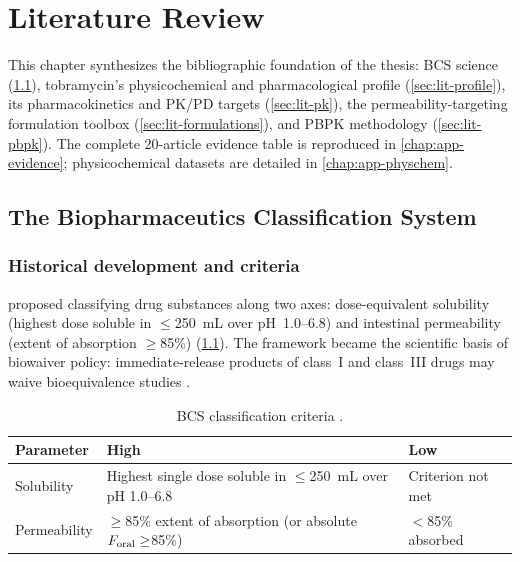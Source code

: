 \chapter{Literature Review}
\label{chap:literature}

This chapter synthesizes the bibliographic foundation of the thesis: BCS science (\cref{sec:lit-bcs}), tobramycin's physicochemical and pharmacological profile (\cref{sec:lit-profile}), its pharmacokinetics and PK/PD targets (\cref{sec:lit-pk}), the permeability-targeting formulation toolbox (\cref{sec:lit-formulations}), and PBPK methodology (\cref{sec:lit-pbpk}). The complete 20-article evidence table is reproduced in \cref{chap:app-evidence}; physicochemical datasets are detailed in \cref{chap:app-physchem}.

\section{The Biopharmaceutics Classification System}
\label{sec:lit-bcs}

\subsection{Historical development and criteria}
\citet{Amidon1995} proposed classifying drug substances along two axes: dose-equivalent solubility (highest dose soluble in $\leq$250~mL over pH~1.0--6.8) and intestinal permeability (extent of absorption $\geq$85\%) (\cref{tab:bcs-criteria}). The framework became the scientific basis of biowaiver policy: immediate-release products of class~I and class~III drugs may waive bioequivalence studies \citep{FDA2021, ICH2019}.

\begin{table}[htbp]
\centering
\caption{BCS classification criteria \citep{Amidon1995, FDA2021}.}
\label{tab:bcs-criteria}
\begin{tabular}{p{3cm}p{5.4cm}p{5.4cm}}
\toprule
Parameter & High & Low\\
\midrule
Solubility & Highest single dose soluble in $\leq$250~mL over pH 1.0--6.8 & Criterion not met\\
Permeability & $\geq$85\% extent of absorption (or absolute $F_{\mathrm{oral}} \geq$85\%) & $<$85\% absorbed\\
\bottomrule
\end{tabular}
\end{table}

